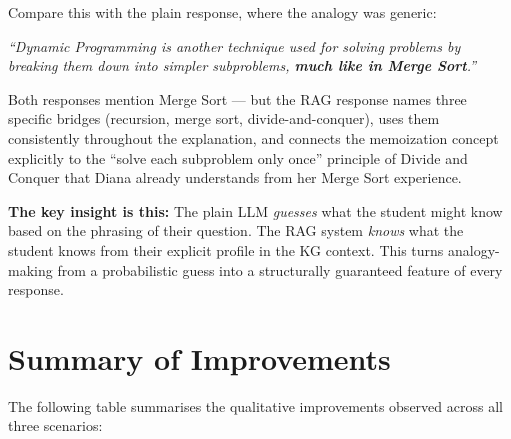 \documentclass[12pt,a4paper]{article}
\newenvironment{quotebox}{%
  \begin{tcolorbox}[
    colback=quotebg,
    colframe=quoteborder,
    left=6pt, right=6pt, top=4pt, bottom=4pt,
    boxrule=0.5pt,
    leftrule=3pt,
    arc=2pt,
    breakable,
  ]
  \itshape\small
}{%
  \end{tcolorbox}
}
\begin{document}
Compare this with the plain response, where the analogy was generic:

\begin{quotebox}
\textit{``Dynamic Programming is another technique used for solving problems by
breaking them down into simpler subproblems, \textbf{much like in Merge Sort}.''}
\end{quotebox}

Both responses mention Merge Sort --- but the RAG response names three specific
bridges (recursion, merge sort, divide-and-conquer), uses them consistently
throughout the explanation, and connects the memoization concept explicitly to
the ``solve each subproblem only once'' principle of Divide and Conquer that
Diana already understands from her Merge Sort experience.

\textbf{The key insight is this:} The plain LLM \textit{guesses} what the
student might know based on the phrasing of their question. The RAG system
\textit{knows} what the student knows from their explicit profile in the KG
context. This turns analogy-making from a probabilistic guess into a
structurally guaranteed feature of every response.

\section{Summary of Improvements}

The following table summarises the qualitative improvements observed across all
three scenarios:
\end{document}
